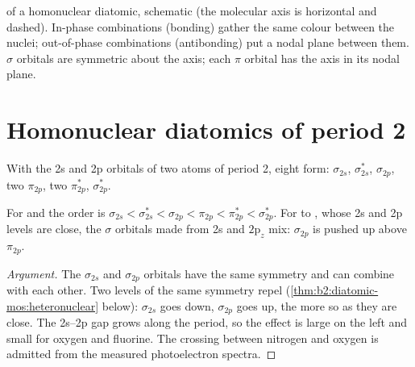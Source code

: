 \begin{omfigure}

{\small {} of a homonuclear diatomic, schematic (the molecular
axis is horizontal and dashed). In-phase combinations (bonding) gather the
same colour between the nuclei; out-of-phase combinations (antibonding) put a
nodal plane between them. $\sigma$ orbitals are symmetric about the axis; each $\pi$
orbital has the axis in its nodal plane.}
\end{omfigure}

\section{Homonuclear diatomics of period 2}

With the 2s and 2p orbitals of two atoms of period 2, eight 
form: $\sigma_{2s}$, $\sigma^*_{2s}$, $\sigma_{2p}$, two $\pi_{2p}$, two $\pi^*_{2p}$,
$\sigma^*_{2p}$.

\begin{proposition}[s--p mixing]\label{prop:b2:diatomic-mos:sp-mixing}
For  and  the order is $\sigma_{2s} < \sigma^*_{2s} < \sigma_{2p} < \pi_{2p} <
\pi^*_{2p} < \sigma^*_{2p}$. For  to , whose 2s and 2p levels are close,
the $\sigma$ orbitals made from 2s and $2\mathrm p_z$ mix: $\sigma_{2p}$ is pushed up above
$\pi_{2p}$.
\end{proposition}

\begin{proof}[Argument]
The $\sigma_{2s}$ and $\sigma_{2p}$ orbitals have the same symmetry and can combine with
each other. Two levels of the same symmetry repel (\cref{thm:b2:diatomic-mos:heteronuclear}
below): $\sigma_{2s}$ goes down, $\sigma_{2p}$ goes up, the more so as they are close. The
2s--2p gap grows along the period, so the effect is large on the left and small for
oxygen and fluorine. The crossing between nitrogen and oxygen is admitted from the
measured photoelectron spectra.
\end{proof}


